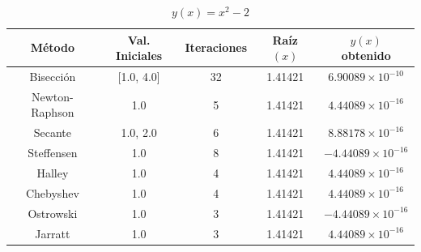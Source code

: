 \begin{table}[H]
\centering

\renewcommand{\arraystretch}{1.3} %
\setlength{\tabcolsep}{12pt}      %

\begin{tabular}{ccccc}
\hline
Método & Val. Iniciales & Iteraciones & Raíz $(x)$ & $y(x)$ obtenido \\
\hline

Bisección      & [1.0, 4.0] & 32 & 1.41421 & $6.90089\times10^{-10}$ \\

Newton-Raphson & 1.0        &  5 & 1.41421 & $4.44089\times10^{-16}$ \\

Secante        & 1.0, 2.0   &  6 & 1.41421 & $8.88178\times10^{-16}$ \\

Steffensen     & 1.0        &  8 & 1.41421 & $-4.44089\times10^{-16}$ \\

Halley         & 1.0        &  4 & 1.41421 & $4.44089\times10^{-16}$ \\

Chebyshev      & 1.0        &  4 & 1.41421 & $4.44089\times10^{-16}$ \\

Ostrowski      & 1.0        &  3 & 1.41421 & $-4.44089\times10^{-16}$ \\

Jarratt        & 1.0        &  3 & 1.41421 & $4.44089\times10^{-16}$ \\

\hline
\end{tabular}

\caption{$y(x) = x^{2} - 2$}
\end{table}



